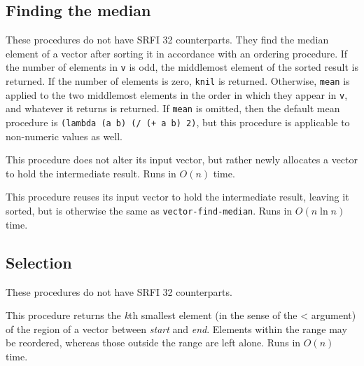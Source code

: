 \subsection{Finding the median}\label{Findingthemedian}

These procedures do not have SRFI 32 counterparts. They find the median
element of a vector after sorting it in accordance with an ordering
procedure. If the number of elements in \texttt{v} is odd, the
middlemost element of the sorted result is returned. If the number of
elements is zero, \texttt{knil} is returned. Otherwise, \texttt{mean} is
applied to the two middlemost elements in the order in which they appear
in \texttt{v}, and whatever it returns is returned. If \texttt{mean} is
omitted, then the default mean procedure is
\texttt{(lambda\ (a\ b)\ (/\ (+\ a\ b)\ 2)}, but this procedure is
applicable to non-numeric values as well.

\begin{entry}{%
  }

  This procedure does not alter its input vector, but rather newly
  allocates a vector to hold the intermediate result. Runs in $O(n)$
  time.
\end{entry}

\begin{entry}{%
  }

  This procedure reuses its input vector to hold the intermediate
  result, leaving it sorted, but is otherwise the same as
  \texttt{vector-find-median}. Runs in $O(n\ln{} n)$
  time. 
\end{entry}

\subsection{Selection}\label{Selection}

These procedures do not have SRFI 32 counterparts.

\begin{entry}{%
  }

  This procedure returns the \emph{k}th smallest element (in the sense
  of the \textless{} argument) of the region of a vector between
  \emph{start} and \emph{end}. Elements within the range may be
  reordered, whereas those outside the range are left alone. Runs in
  $O(n)$ time.
\end{entry}


